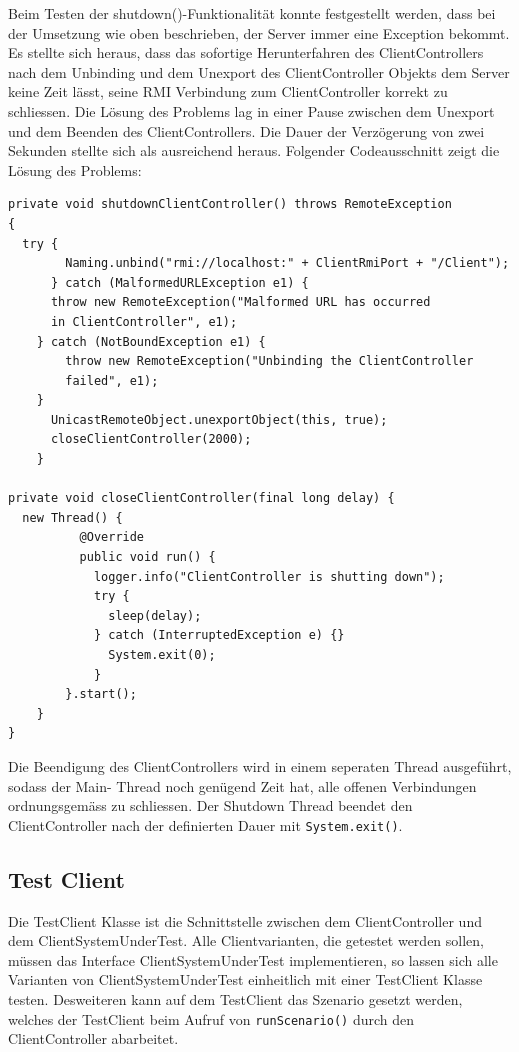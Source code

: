 Beim Testen der shutdown()-Funktionalität konnte festgestellt werden, dass bei der Umsetzung wie oben beschrieben, der Server immer eine Exception bekommt. Es stellte sich heraus, dass das sofortige Herunterfahren des ClientControllers nach dem Unbinding und dem Unexport des ClientController Objekts dem Server keine Zeit lässt, seine RMI Verbindung zum ClientController korrekt zu schliessen. Die Lösung des Problems lag in einer Pause zwischen dem Unexport und dem Beenden des ClientControllers. Die Dauer der Verzögerung von zwei Sekunden stellte sich als ausreichend heraus. Folgender Codeausschnitt zeigt die Lösung des Problems:
\begin{verbatim}
private void shutdownClientController() throws RemoteException 
{
  try {
		Naming.unbind("rmi://localhost:" + ClientRmiPort + "/Client");
      } catch (MalformedURLException e1) {
	  throw new RemoteException("Malformed URL has occurred 
	  in ClientController", e1);
	} catch (NotBoundException e1) {
	    throw new RemoteException("Unbinding the ClientController 
	    failed", e1);
	}
	  UnicastRemoteObject.unexportObject(this, true);
	  closeClientController(2000);
	}

private void closeClientController(final long delay) {
  new Thread() {
		  @Override
		  public void run() {
		    logger.info("ClientController is shutting down");
		    try {
			  sleep(delay);
			} catch (InterruptedException e) {}
			  System.exit(0);
			}
		}.start();
	}
}
\end{verbatim}
Die Beendigung des ClientControllers wird in einem seperaten Thread ausgeführt, so\-dass der Main- Thread noch ge\-nü\-gend Zeit hat, alle of\-fe\-nen Ver\-bin\-dun\-gen ord\-nungs\-gemäss zu schliessen. Der Shutdown Thread beendet den ClientController nach der definierten Dauer mit \verb+System.exit()+.   

\subsection{Test Client}
\label{sec:testclient}
Die TestClient Klasse ist die Schnittstelle zwischen dem ClientController und dem ClientSystemUnderTest. Alle Clientvarianten, die getestet werden sollen, müssen das Interface ClientSystemUnderTest implementieren, so lassen sich alle Varianten von ClientSystemUnderTest einheitlich mit einer TestClient Klasse testen. Desweiteren kann auf dem TestClient das Szenario gesetzt werden, welches der TestClient beim Aufruf von \verb+runScenario()+ durch den ClientController abarbeitet.

